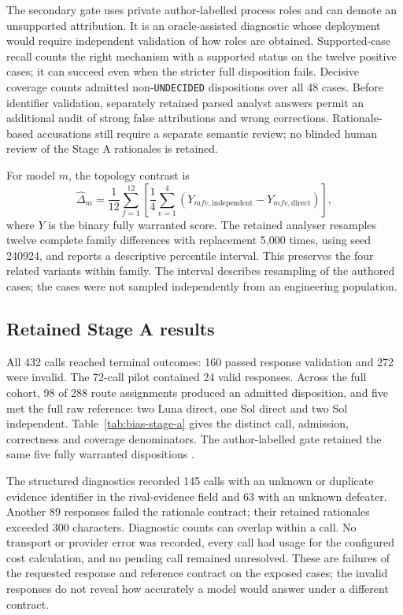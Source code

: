 \documentclass[preprint,12pt]{elsarticle}
\begin{document}
The secondary gate uses private author-labelled process roles and can demote an unsupported attribution. It is an oracle-assisted diagnostic whose deployment would require independent validation of how roles are obtained. Supported-case recall counts the right mechanism with a supported status on the twelve positive cases; it can succeed even when the stricter full disposition fails. Decisive coverage counts admitted non-\texttt{UNDECIDED} dispositions over all 48 cases. Before identifier validation, separately retained parsed analyst answers permit an additional audit of strong false attributions and wrong corrections. Rationale-based accusations still require a separate semantic review; no blinded human review of the Stage A rationales is retained.

For model \(m\), the topology contrast is
\begin{equation}
\widehat{\Delta}_{m}=\frac{1}{12}\sum_{f=1}^{12}
\left[\frac{1}{4}\sum_{v=1}^{4}
\left(Y_{mfv,\mathrm{independent}}-Y_{mfv,\mathrm{direct}}\right)\right],
\end{equation}
where \(Y\) is the binary fully warranted score. The retained analyser resamples twelve complete family differences with replacement 5,000 times, using seed 240924, and reports a descriptive percentile interval. This preserves the four related variants within family. The interval describes resampling of the authored cases; the cases were not sampled independently from an engineering population.

\subsection{Retained Stage A results}
All 432 calls reached terminal outcomes: 160 passed response validation and 272 were invalid. The 72-call pilot contained 24 valid responses. Across the full cohort, 98 of 288 route assignments produced an admitted disposition, and five met the full raw reference: two Luna direct, one Sol direct and two Sol independent. Table~\ref{tab:bias-stage-a} gives the distinct call, admission, correctness and coverage denominators. The author-labelled gate retained the same five fully warranted dispositions \citep{earlBiasStageA}.



The structured diagnostics recorded 145 calls with an unknown or duplicate evidence identifier in the rival-evidence field and 63 with an unknown defeater. Another 89 responses failed the rationale contract; their retained rationales exceeded 300 characters. Diagnostic counts can overlap within a call. No transport or provider error was recorded, every call had usage for the configured cost calculation, and no pending call remained unresolved. These are failures of the requested response and reference contract on the exposed cases; the invalid responses do not reveal how accurately a model would answer under a different contract.
\end{document}
